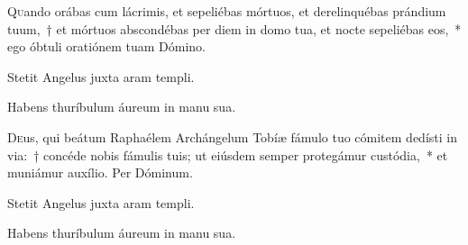 \documentclass[vesperale_romanum.tex]{subfiles}
\begin{document}
\label{116_8c_oct}


\lettrine[depth=1]{Q}{u}ando orábas cum lácrimis, et sepeliébas mórtuos, et derelinquébas prándium tuum,~† et mórtuos abscondébas per diem in domo tua, et nocte sepeliébas eos,~* ego óbtuli oratiónem tuam Dómino.

\hymnus


\vv Stetit Angelus juxta aram templi.

\rr Habens thuríbulum áureum in manu sua.

\admagnificat


\oratio

 \lettrine{D}{e}us, qui beátum Raphaélem Archángelum Tobíæ fámulo tuo cómitem dedísti in via:~† concéde nobis fámulis tuis; ut eiúsdem semper protegámur custódia,~* et muniámur auxílio.
Per Dóminum.


\label{137_8c_oct}
{}


\vv Stetit Angelus juxta aram templi.

\rr Habens thuríbulum áureum in manu sua.

\admagnificat

\zerobaroffsettextleft
\zerobaroffsettextright
{}
\resetbaroffsettextleft
\resetbaroffsettextright

\commemoration

\myrule

\thispagestyle{empty}



\end{document}

